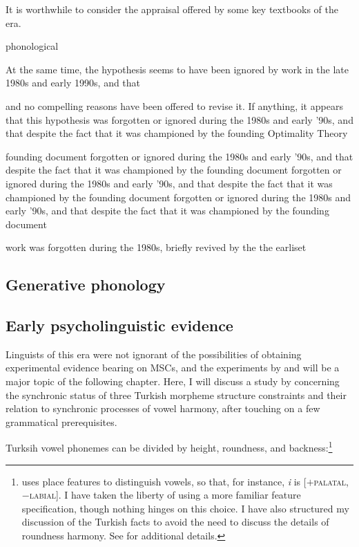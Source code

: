 It is worthwhile to consider the appraisal offered by some key textbooks of the era.

\citet{Dell1973}

\citet{Anderson1974}

\citet{Kenstowicz1979}

phonological

At the same time, the hypothesis seems to have been ignored by work in the late 1980s and early 1990s, and that 

and no compelling reasons have been offered to revise it. If anything, it appears that this hypothesis was forgotten or ignored during the 1980s and early '90s, and that despite the fact that it was championed by the founding Optimality Theory


 founding document forgotten or ignored during the 1980s and early '90s, and that despite the fact that it was championed by the founding document forgotten or ignored during the 1980s and early '90s, and that despite the fact that it was championed by the founding document forgotten or ignored during the 1980s and early '90s, and that despite the fact that it was championed by the founding document 

 work was forgotten during the 1980s, briefly revived by the the earliset 

\subsection{Generative phonology}


\subsection{Early psycholinguistic evidence}

Linguists of this era were not ignorant of the possibilities of obtaining experimental evidence bearing on MSCs, and the experiments by \citet{Greenberg1964} and \citet{Scholes1966} will be a major topic of the following chapter. Here, I will discuss a study by \citet{Zimmer1969} concerning the synchronic status of three Turkish morpheme structure constraints and their relation to synchronic processes of vowel harmony, after touching on a few grammatical prerequisites.

Turksih vowel phonemes can be divided by height, roundness, and backness:\footnote{\citeauthor{Zimmer1969} uses place features to distinguish vowels, so that, for instance, \emph{i} is [$+$\textsc{palatal}, $-$\textsc{labial}]. I have taken the liberty of using a more familiar feature specification, though nothing hinges on this choice. I have also structured my discussion of the Turkish facts to avoid the need to discuss the details of roundness harmony. See \citealt{Zimmer1969} for additional details.}

